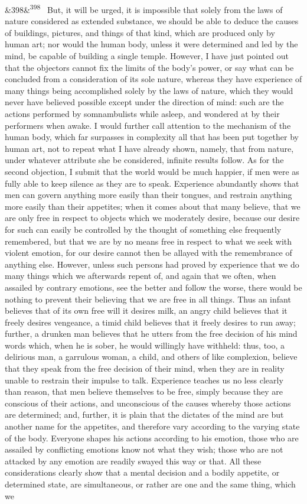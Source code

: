 \documentclass[12pt]{article}
\newcommand{\para}[1][]{\par\noindent\ifx&#1&\else\textsuperscript{\footnotesize #1}~\fi}
\begin{document}
\para[398] But, it will be urged, it is impossible that solely from the laws of nature considered as extended substance, we should be able to deduce the causes of buildings, pictures, and things of that kind, which are produced only by human art; nor would the human body, unless it were determined and led by the mind, be capable of building a single temple. However, I have just pointed out that the objectors cannot fix the limits of the body's power, or say what can be concluded from a consideration of its sole nature, whereas they have experience of many things being accomplished solely by the laws of nature, which they would never have believed possible except under the direction of mind: such are the actions performed by somnambulists while asleep, and wondered at by their performers when awake. I would further call attention to the mechanism of the human body, which far surpasses in complexity all that has been put together by human art, not to repeat what I have already shown, namely, that from nature, under whatever attribute she be considered, infinite results follow. As for the second objection, I submit that the world would be much happier, if men were as fully able to keep silence as they are to speak. Experience abundantly shows that men can govern anything more easily than their tongues, and restrain anything more easily than their appetites; when it comes about that many believe, that we are only free in respect to objects which we moderately desire, because our desire for such can easily be controlled by the thought of something else frequently remembered, but that we are by no means free in respect to what we seek with violent emotion, for our desire cannot then be allayed with the remembrance of anything else. However, unless such persons had proved by experience that we do many things which we afterwards repent of, and again that we often, when assailed by contrary emotions, see the better and follow the worse, there would be nothing to prevent their believing that we are free in all things. Thus an infant believes that of its own free will it desires milk, an angry child believes that it freely desires vengeance, a timid child believes that it freely desires to run away; further, a drunken man believes that he utters from the free decision of his mind words which, when he is sober, he would willingly have withheld: thus, too, a delirious man, a garrulous woman, a child, and others of like complexion, believe that they speak from the free decision of their mind, when they are in reality unable to restrain their impulse to talk. Experience teaches us no less clearly than reason, that men believe themselves to be free, simply because they are conscious of their actions, and unconscious of the causes whereby those actions are determined; and, further, it is plain that the dictates of the mind are but another name for the appetites, and therefore vary according to the varying state of the body. Everyone shapes his actions according to his emotion, those who are assailed by conflicting emotions know not what they wish; those who are not attacked by any emotion are readily swayed this way or that. All these considerations clearly show that a mental decision and a bodily appetite, or determined state, are simultaneous, or rather are one and the same thing, which we 
\end{document}
